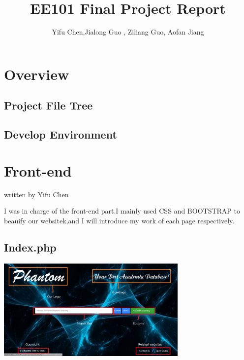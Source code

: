 \documentclass[10pt,twoside,a4paper,titlepage]{article}
\title{EE101 Final Project Report}
\author{Yifu Chen,Jialong Guo , Ziliang Guo, Aofan Jiang}
\begin{document}
\maketitle
\phantom{s}
\thispagestyle{empty}
\clearpage

\tableofcontents
\thispagestyle{empty}
\newpage
\setcounter{page}{1}

\section{Overview}
\subsection{Project File Tree}

\subsection{Develop Environment}


\section{Front-end}
written by Yifu Chen
	
	I was in charge of the front-end part.I mainly used CSS and BOOTSTRAP to beauify our websitek,and I will introduce my work  of each page respectively.
	
	\subsection{Index.php}
	
	\includegraphics[width=0.7\textwidth]{cyf/index_structure.PNG}
	
\end{document}
